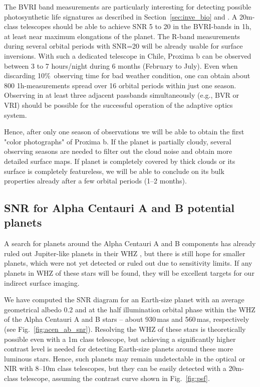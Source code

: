 \documentclass{emulateapj}
\begin{document}
The BVRI band measurements are particularly interesting for detecting possible 
photosynthetic life signatures as described in Section~\ref{sec:inve_bio} 
and \cite{berdetal2016}. A 20m-class telescopes
should be able to achieve SNR 5 to 20 in the BVRI-bands in 1h, at least near
maximum elongations of the planet. The R-band measurements during several 
orbital periods with SNR=20 will be already usable for surface inversions. 
With such a dedicated telescope in Chile, Proxima b can be observed between 
3 to 7 hours/night during 6 months (February to July). 
Even when discarding 10\%\ observing time for bad weather condition, 
one can obtain about 800 1h-measurements spread over 16 orbital periods 
within just one season. Observing in at least three adjacent passbands 
simultaneously (e.g., BVR or VRI) should be possible for the successful 
operation of the adaptive optics system. 

Hence, after only one season of observations we will be able to obtain
the first "color photographs" of Proxima b. If the planet is partially cloudy,
several observing seasons are needed to filter out the cloud noise
and obtain more detailed surface maps. If planet is completely covered
by thick clouds or its surface is completely featureless, we will be able
to conclude on its bulk properties already after a few orbital periods
(1--2 months).

\subsection{SNR for Alpha Centauri A and B potential planets}\label{sec:snr_ab}

A search for planets around the Alpha Centauri A and B components
has already ruled out Jupiter-like planets in their WHZ \citep{acen_jup}, but there is
still hope for smaller planets, which were not yet detected or ruled out 
due to sensitivity limits. If any planets in WHZ of these stars will be found,
they will be excellent targets for our indirect surface imaging.

We have computed the SNR diagram for an Earth-size planet with an average
geometrical albedo 0.2 and at the half illumination orbital phase within the WHZ 
of the Alpha Centauri A and B stars -- about 930\,mas and 560\,mas, respectively
(see Fig.~\ref{fig:acen_ab_snr}).
Resolving the WHZ of these stars is theoretically possible
even with a 1m class telescope, but achieving a significantly higher contrast 
level is needed for detecting Earth-size planets 
around these more luminous stars.
Hence, such planets may remain undetectable in the optical or NIR 
with 8--10m class telescopes, but they can be easily detected with a 20m-class telescope, 
assuming the contrast curve shown in Fig.~\ref{fig:psf}.
\end{document}
